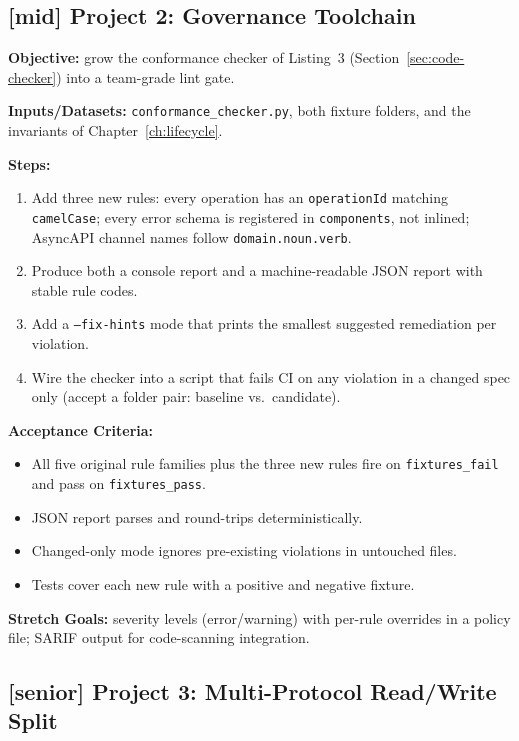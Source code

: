 \subsection{[mid] Project 2: Governance Toolchain}

\textbf{Objective:} grow the conformance checker of
Listing~3 (Section~\ref{sec:code-checker}) into a team-grade lint gate.

\textbf{Inputs/Datasets:} \texttt{conformance\_checker.py}, both fixture
folders, and the invariants of Chapter~\ref{ch:lifecycle}.

\textbf{Steps:}
\begin{enumerate}
  \item Add three new rules: every operation has an \texttt{operationId}
        matching \texttt{camelCase}; every error schema is registered in
        \texttt{components}, not inlined; AsyncAPI channel names follow
        \texttt{domain.noun.verb}.
  \item Produce both a console report and a machine-readable JSON report
        with stable rule codes.
  \item Add a \texttt{--fix-hints} mode that prints the smallest suggested
        remediation per violation.
  \item Wire the checker into a script that fails CI on any violation in a
        changed spec only (accept a folder pair: baseline vs.\ candidate).
\end{enumerate}

\textbf{Acceptance Criteria:}
\begin{itemize}
  \item[$\square$] All five original rule families plus the three new rules
        fire on \texttt{fixtures\_fail} and pass on \texttt{fixtures\_pass}.
  \item[$\square$] JSON report parses and round-trips deterministically.
  \item[$\square$] Changed-only mode ignores pre-existing violations in
        untouched files.
  \item[$\square$] Tests cover each new rule with a positive and negative
        fixture.
\end{itemize}

\textbf{Stretch Goals:} severity levels (error/warning) with per-rule
overrides in a policy file; SARIF output for code-scanning integration.

\subsection{[senior] Project 3: Multi-Protocol Read/Write Split}

